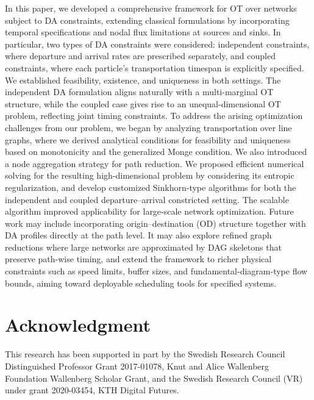 \documentclass[11pt]{article}
\begin{document}
In this paper, we developed a comprehensive framework for OT over networks subject to DA constraints, extending classical formulations by incorporating temporal specifications and nodal flux limitations at sources and sinks. In particular, two types of DA constraints were considered: independent constraints, where departure and arrival rates are prescribed separately, and coupled constraints, where each particle’s transportation timespan is explicitly specified. We established feasibility, existence, and uniqueness in both settings. The independent DA formulation aligns naturally with a multi-marginal OT structure, while the coupled case gives rise to an unequal-dimensional OT problem, reflecting joint timing constraints. To address the arising optimization challenges from our problem, we began by analyzing transportation over line graphs, where we derived analytical conditions for feasibility and uniqueness based on monotonicity and the generalized Monge condition. We also introduced a node aggregation strategy for path reduction. We proposed efficient numerical solving for the resulting high-dimensional problem by considering its entropic regularization, and develop customized Sinkhorn-type algorithms for both the independent and coupled departure--arrival constricted setting. The scalable algorithm improved applicability for large-scale network optimization. Future work may include incorporating origin–destination (OD) structure together with DA profiles directly at the path level. It may also explore refined graph reductions where large networks are approximated by DAG skeletons that preserve path-wise timing, and extend the framework to richer physical constraints such as speed limits, buffer sizes, and fundamental-diagram-type flow bounds, aiming toward deployable scheduling tools for specified systems. 


\section*{Acknowledgment}
This research has been supported in part by the Swedish Research Council Distinguished Professor Grant 2017-01078, Knut and Alice Wallenberg Foundation Wallenberg Scholar Grant, and the Swedish Research Council (VR) under grant 2020-03454, KTH Digital Futures.


  

\end{document}

